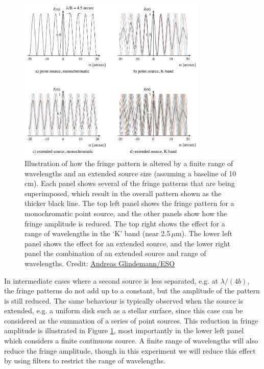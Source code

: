 \documentclass[11pt]{article}
\begin{document}
\begin{figure}[h!]
    \centering
    \includegraphics[width=0.8\textwidth]{doc/coherence.png}
    \caption{Illustration of how the fringe pattern is altered by a finite range of wavelengths and an extended source size (assuming a baseline of 10\,cm). Each panel shows several of the fringe patterns that are being superimposed, which result in the overall pattern shown as the thicker black line. The top left panel shows the fringe pattern for a monochromatic point source, and the other panels show how the fringe amplitude is reduced. The top right shows the effect for a range of wavelengths in the `K' band (near 2.5\,$\mu$m). The lower left panel shows the effect for an extended source, and the lower right panel the combination of an extended source and range of wavelengths. Credit: \href{https://www.eso.org/sci/facilities/paranal/telescopes/vlti/tuto/tutorial_spatial_interferometry.pdf}{Andreas Glindemann/ESO}}
    \label{fig:coherence}
\end{figure}

In intermediate cases where a second source is less separated, e.g. at $\lambda/(4b)$, the fringe patterns do not add up to a constant, but the amplitude of the pattern is still reduced. The same behaviour is typically observed when the source is extended, e.g. a uniform disk such as a stellar surface, since this case can be considered as the summation of a series of point sources. This reduction in fringe amplitude is illustrated in Figure \ref{fig:coherence}, most importantly in the lower left panel which considers a finite continuous source. A finite range of wavelengths will also reduce the fringe amplitude, though in this experiment we will reduce this effect by using filters to restrict the range of wavelengths.
\end{document}
